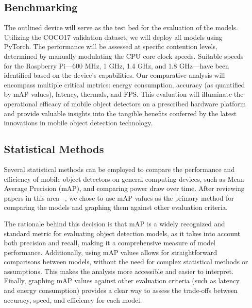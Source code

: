 \documentclass[10pt,twocolumn,letterpaper]{article}
\begin{document}
\subsection{Benchmarking}
\label{subsec:Benchmarking}

The outlined device will serve as the test bed for the evaluation of the models. Utilizing the COCO17 validation dataset, we will deploy all models using PyTorch. The performance will be assessed at specific contention levels, determined by manually modulating the CPU core clock speeds. Suitable speeds for the Raspberry Pi—600 MHz, 1 GHz, 1.4 GHz, and 1.8 GHz—have been identified based on the device's capabilities. Our comparative analysis will encompass multiple critical metrics: energy consumption, accuracy (as quantified by mAP values), latency, thermals, and FPS. This  evaluation will illuminate the operational efficacy of mobile object detectors on a prescribed hardware platform and provide valuable insights into the tangible benefits conferred by the latest innovations in mobile object detection technology.

\subsection{Statistical Methods}
\label{subsec:StatisticalMethods}
Several statistical methods can be employed to compare the performance and efficiency of mobile object detectors on general computing devices, such as Mean Average Precision (mAP), and comparing power draw over time.
After reviewing papers in this area ~\cite{chen2022mobileformer,honegger2014real,liu2019edge,ganesh2022yoloret,xiong2021mobiledets,li2021npas,qin2019thundernet,mao2016real,ullah2020cpu}, we chose to use mAP values as the primary method for comparing the models and graphing them against other evaluation criteria.

The rationale behind this decision is that mAP is a widely recognized and standard metric for evaluating object detection models, as it takes into account both precision and recall, making it a comprehensive measure of model performance.
Additionally, using mAP values allows for straightforward comparisons between models, without the need for complex statistical methods or assumptions.
This makes the analysis more accessible and easier to interpret.
Finally, graphing mAP values against other evaluation criteria (such as latency and energy consumption) provides a clear way to assess the trade-offs between accuracy, speed, and efficiency for each model.
\end{document}
